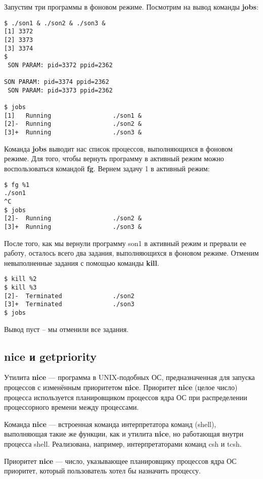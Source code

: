 \documentclass[a4paper]{article}
\begin{document}
	Запустим три программы в фоновом режиме. Посмотрим на вывод команды \textbf{jobs}:
	\begin{lstlisting}[style=crs_bash]
$ ./son1 & ./son2 & ./son3 &
[1] 3372
[2] 3373
[3] 3374
$ 
 SON PARAM: pid=3372 ppid=2362 

SON PARAM: pid=3374 ppid=2362 
 SON PARAM: pid=3373 ppid=2362 

$ jobs
[1]   Running                 ./son1 &
[2]-  Running                 ./son2 &
[3]+  Running                 ./son3 &
	\end{lstlisting}

	Команда \textbf{jobs} выводит нас список процессов, выполняющихся в фоновом режиме. Для того, чтобы вернуть программу в активный режим можно воспользоваться командой \textbf{fg}. Вернем задачу 1 в активный режим:
	\begin{lstlisting}[style=crs_bash]
$ fg %1
./son1
^C
$ jobs
[2]-  Running                 ./son2 &
[3]+  Running                 ./son3 &
	\end{lstlisting}	
	
	После того, как мы вернули программу son1 в активный режим и прервали ее работу, осталось всего два задания, выполняющихся в фоновом режиме. Отменим невыполненные задания с помощью команды \textbf{kill}.	
	\begin{lstlisting}[style=crs_bash]
$ kill %2
$ kill %3
[2]-  Terminated              ./son2
[3]+  Terminated              ./son3
$ jobs
	\end{lstlisting}	
	
	Вывод пуст -- мы отменили все задания.
	
	\subsection{nice и getpriority}
	Утилита \textbf{nice} --- программа в UNIX-подобных ОС, предназначенная для запуска процессов с изменённым приоритетом \textbf{nice}. Приоритет \textbf{nice} (целое число) процесса используется планировщиком процессов ядра ОС при распределении процессорного времени между процессами.
	
	Команда \textbf{nice} --- встроенная команда интерпретатора команд (shell), выполняющая такие же функции, как и утилита \textbf{nice}, но работающая внутри процесса shell. Реализована, например, интерпретаторами команд csh и tcsh.

	Приоритет \textbf{nice} --- число, указывающее планировщику процессов ядра ОС приоритет, который пользователь хотел бы назначить процессу.
	
\end{document}

